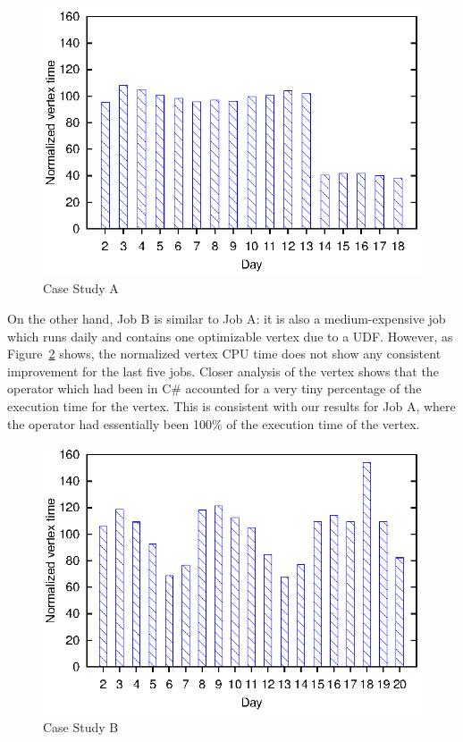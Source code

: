 \begin{figure}[ht]
\includegraphics{graphs/normalizedTimesA}
\caption{Case Study A \label{fig:CaseStudyA}}
\end{figure}

On the other hand, Job B is similar to Job A: it is also a medium-expensive job which runs daily and contains one optimizable vertex due to a UDF.
However, as Figure~\ref{fig:CaseStudyB} shows, the normalized vertex CPU time does not show any consistent improvement for the last five jobs.
Closer analysis of the vertex shows that the operator which had been in C\# accounted for a very tiny percentage of the execution time for the vertex.
This is consistent with our results for Job A, where the operator had essentially been 100\% of the execution time of the vertex.
\begin{figure}[ht]
\includegraphics{graphs/normalizedTimesB}
\caption{Case Study B \label{fig:CaseStudyB}}
\end{figure}

